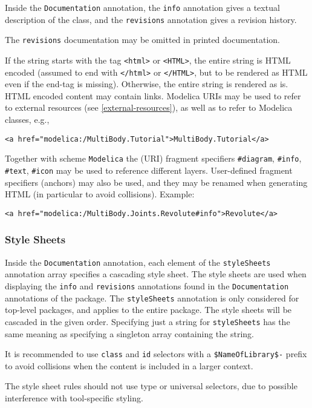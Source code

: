 Inside the \lstinline!Documentation! annotation, the \lstinline!info! annotation gives a textual description of the class, and the \lstinline!revisions! annotation gives a revision history.

\begin{nonnormative}
The \lstinline!revisions! documentation may be omitted in printed documentation.
\end{nonnormative}

If the string starts with the tag \lstinline!<html>! or \lstinline!<HTML>!, the entire string is HTML encoded (assumed to end with \lstinline!</html>! or \lstinline!</HTML>!, but to be rendered as HTML even if the end-tag is missing).
Otherwise, the entire string is rendered as is.
HTML encoded content may contain links.
Modelica URIs may be used to refer to external resources (see \cref{external-resources}), as well as to refer to Modelica classes, e.g.,
\begin{lstlisting}[language=modelica]
<a href="modelica:/MultiBody.Tutorial">MultiBody.Tutorial</a>
\end{lstlisting}

Together with scheme \lstinline!Modelica! the (URI) fragment specifiers \lstinline!#diagram!, \lstinline!#info!, \lstinline!#text!, \lstinline!#icon! may be used to reference different layers.
User-defined fragment specifiers (anchors) may also be used, and they may be renamed when generating HTML (in particular to avoid collisions).
Example:
\begin{lstlisting}[language=modelica]
<a href="modelica:/MultiBody.Joints.Revolute#info">Revolute</a>
\end{lstlisting}

\subsubsection{Style Sheets}\label{style-sheets}

Inside the \lstinline!Documentation! annotation, each element of the \lstinline!styleSheets! annotation array specifies a cascading style sheet.
The style sheets are used when displaying the \lstinline!info! and \lstinline!revisions! annotations found in the \lstinline!Documentation! annotations of the package.
The \lstinline!styleSheets! annotation is only considered for top-level packages, and applies to the entire package.
The style sheets will be cascaded in the given order.
Specifying just a string for \lstinline!styleSheets! has the same meaning as specifying a singleton array containing the string.
\begin{nonnormative}
It is recommended to use \lstinline[language=CSS]!class! and \lstinline[language=CSS]!id! selectors with a \lstinline[language=CSS]!$NameOfLibrary$-! prefix to avoid collisions when the content is included in a larger context.
\end{nonnormative}
The style sheet rules should not use type or universal selectors, due to possible interference with tool-specific styling.


